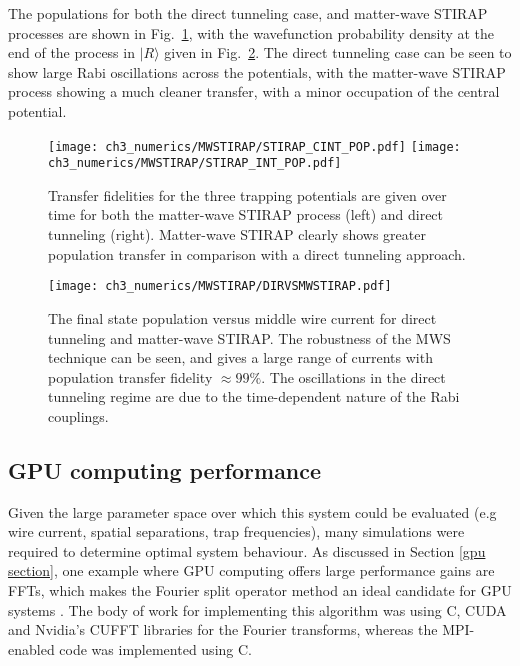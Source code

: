 The populations for both the direct tunneling case, and matter-wave STIRAP processes are shown in Fig.~\ref{fig:mwsVsDT}, with the wavefunction probability density at the end of the process in $|R\rangle$ given in Fig.~\ref{fig:DIRVSMWSTIRAP}. The direct tunneling case can be seen to show large Rabi oscillations across the potentials, with the matter-wave STIRAP process showing a much cleaner transfer, with a minor occupation of the central potential.

\begin{figure}[tb]
    \centering
  \texttt{[image: ch3\_numerics/MWSTIRAP/STIRAP\_CINT\_POP.pdf]}
  \texttt{[image: ch3\_numerics/MWSTIRAP/STIRAP\_INT\_POP.pdf]}
  \caption{Transfer fidelities for the three trapping potentials are given over time for both the matter-wave STIRAP process (left) and direct tunneling (right). Matter-wave STIRAP clearly shows greater population transfer in comparison with a direct tunneling approach.}
  \label{fig:mwsVsDT}
\end{figure}

\begin{figure}[tb]
    \centering
  \texttt{[image: ch3\_numerics/MWSTIRAP/DIRVSMWSTIRAP.pdf]}
  \caption{The final state population versus middle wire current for direct tunneling and matter-wave STIRAP. The robustness of the MWS technique can be seen, and gives a large range of currents with population transfer fidelity $\approx 99 \%$. The oscillations in the direct tunneling regime are due to the time-dependent nature of the Rabi couplings.}
  \label{fig:DIRVSMWSTIRAP}
\end{figure}


\subsection{GPU computing performance}
Given the large parameter space over which this system could be evaluated (e.g wire current, spatial separations, trap frequencies), many simulations were required to determine optimal system behaviour. As discussed in Section \ref{gpu section}, one example where GPU computing offers large performance gains are FFTs, which makes the Fourier split operator method an ideal candidate for GPU systems \cite{Bauke:11}. The body of work for implementing this algorithm was using C, CUDA and Nvidia's CUFFT libraries for the Fourier transforms, whereas the MPI-enabled code was implemented using C.

